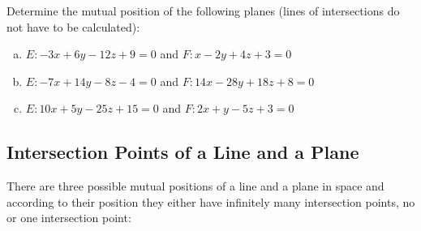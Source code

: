 \documentclass[12pt,eng]{skript_ogg}
\begin{document}
\begin{uebung}
Determine the mutual position of the following planes (lines of intersections do not have to be calculated):
\begin{enumerate}[(a)]
\setlength{\itemsep}{-1ex}
\item $E:-3x+6y-12z+9=0$ and $F:x-2y+4z+3=0$

\vspace{1.6cm}

\item $E:-7x+14y-8z-4=0$ and $F:14x-28y+18z+8=0$

\vspace{1.6cm}

\item $E:10x+5y-25z+15=0$ and $F:2x+y-5z+3=0$

\vspace{1.6cm}

\end{enumerate}
\end{uebung}


\subsection{Intersection Points of a Line and a Plane}
There are three possible mutual positions of a line and a plane in space and according to their position they either have infinitely many intersection points, no or one intersection point:
\end{document}
